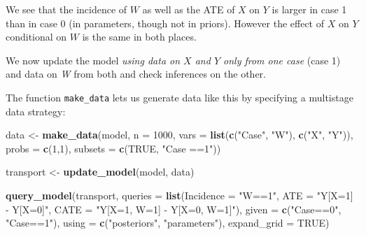 \documentclass[
  12pt,
]{book}
\newenvironment{Shaded}{\begin{snugshade}}{\end{snugshade}}
\newcommand{\AttributeTok}[1]{\textcolor[rgb]{0.13,0.29,0.53}{#1}}
\newcommand{\ConstantTok}[1]{\textcolor[rgb]{0.56,0.35,0.01}{#1}}
\newcommand{\DecValTok}[1]{\textcolor[rgb]{0.00,0.00,0.81}{#1}}
\newcommand{\FunctionTok}[1]{\textcolor[rgb]{0.13,0.29,0.53}{\textbf{#1}}}
\newcommand{\NormalTok}[1]{#1}
\newcommand{\OtherTok}[1]{\textcolor[rgb]{0.56,0.35,0.01}{#1}}
\newcommand{\StringTok}[1]{\textcolor[rgb]{0.31,0.60,0.02}{#1}}
\begin{document}
We see that the incidence of \(W\) as well as the ATE of \(X\) on \(Y\) is larger in case 1 than in case 0 (in parameters, though not in priors). However the effect of \(X\) on \(Y\) conditional on \(W\) is the same in both places.

We now update the model \emph{using data on \(X\) and \(Y\) only from one case} (case 1) and data on \emph{W} from both and check inferences on the other.

The function \texttt{make\_data} lets us generate data like this by specifying a multistage data strategy:

\begin{Shaded}
\begin{Highlighting}[]
\NormalTok{data }\OtherTok{\textless{}{-}} \FunctionTok{make\_data}\NormalTok{(model, }\AttributeTok{n =} \DecValTok{1000}\NormalTok{, }
                  \AttributeTok{vars =} \FunctionTok{list}\NormalTok{(}\FunctionTok{c}\NormalTok{(}\StringTok{"Case"}\NormalTok{, }\StringTok{"W"}\NormalTok{), }\FunctionTok{c}\NormalTok{(}\StringTok{"X"}\NormalTok{, }\StringTok{"Y"}\NormalTok{)), }
                  \AttributeTok{probs =} \FunctionTok{c}\NormalTok{(}\DecValTok{1}\NormalTok{,}\DecValTok{1}\NormalTok{),}
                  \AttributeTok{subsets =} \FunctionTok{c}\NormalTok{(}\ConstantTok{TRUE}\NormalTok{, }\StringTok{"Case ==1"}\NormalTok{))}

\NormalTok{transport }\OtherTok{\textless{}{-}} \FunctionTok{update\_model}\NormalTok{(model, data)}

\FunctionTok{query\_model}\NormalTok{(transport,}
            \AttributeTok{queries =} \FunctionTok{list}\NormalTok{(}\AttributeTok{Incidence =} \StringTok{"W==1"}\NormalTok{, }
                           \AttributeTok{ATE =} \StringTok{"Y[X=1] {-} Y[X=0]"}\NormalTok{, }
                           \AttributeTok{CATE =} \StringTok{"Y[X=1, W=1] {-} Y[X=0, W=1]"}\NormalTok{),}
            \AttributeTok{given =} \FunctionTok{c}\NormalTok{(}\StringTok{"Case==0"}\NormalTok{, }\StringTok{"Case==1"}\NormalTok{),}
            \AttributeTok{using =} \FunctionTok{c}\NormalTok{(}\StringTok{"posteriors"}\NormalTok{, }\StringTok{"parameters"}\NormalTok{), }\AttributeTok{expand\_grid =} \ConstantTok{TRUE}\NormalTok{)}
\end{Highlighting}
\end{Shaded}
\end{document}
